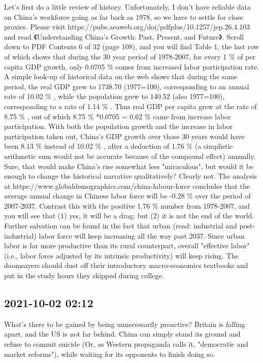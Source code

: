 \documentclass[twocolumn]{ctexart}
\begin{document}
Let's first do a little review of history. Unfortunately, I don't have reliable data on China's workforce going as far back as 1978, so we have to settle for close proxies.
Please visit https://pubs.aeaweb.org/doi/pdfplus/10.1257/jep.26.4.103 and read 《Understanding China's Growth: Past, Present, and Future》. Scroll down to PDF Contents 6 of 32 (page 108), and you will find Table 1, the last row of which shows that during the 30 year period of 1978-2007, for every 1 \%  of per capita GDP growth, only 0.0705 \%  comes from increased labor participation rate.
A simple look-up of historical data on the web shows that during the same period, the real GDP grew to 1738.70 (1977=100), corresponding to an annual rate of 10.02 \% , while the population grew to 140.52 (also 1977=100), corresponding to a rate of 1.14 \% . Thus real GDP per capita grew at the rate of 8.75 \% , out of which 8.75 \% *0.0705 = 0.62 \%  came from increase labor participation.
With both the population growth and the increase in labor participation taken out, China's GDP growth over those 30 years would have been 8.13 \%  instead of 10.02 \% , after a deduction of 1.76 \%  (a simplistic arithmetic sum would not be accurate because of the compound effect) annually. Sure, that would make China's rise somewhat less "miraculous", but would it be enough to change the historical narrative qualitatively? Clearly not.
The analysis at https://www.globaldemographics.com/china-labour-force concludes that the average annual change in Chinese labor force will be -0.28 \%  over the period of 2007-2037. Contrast this with the positive 1.76 \%  number from 1978-2007, and you will see that (1) yes, it will be a drag; but (2) it is not the end of the world. Further salvation can be found in the fact that urban (read: industrial and post-industrial) labor force will keep increasing all the way past 2037. Since urban labor is far more productive than its rural counterpart, overall "effective labor" (i.e., labor force adjusted by its intrinsic productivity) will keep rising. The doomsayers should dust off their introductory macro-economics textbooks and put in the study hours they skipped during college.
\subsection*{2021-10-02 02:12}

What's there to be gained by being unnecessarily proactive? Britain is falling apart, and the US is not far behind. China can simply stand its ground and refuse to commit suicide (Or, as Western propaganda calls it, "democratic and market reforms"), while waiting for its opponents to finish doing so.
\end{document}

